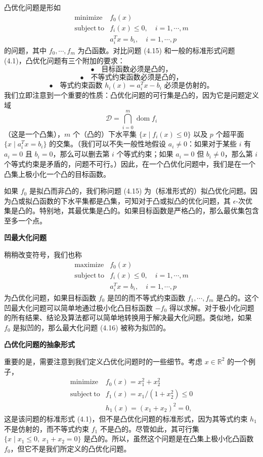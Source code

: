 \documentclass[UTF8,12pt,a4paper,fontset=fandol]{ctexart}
\begin{document}
凸优化问题是形如
\begin{equation}
\begin{array}{ll}
\mathop{\mathrm{minimize}} & f_0(x)\\
\mathrm{subject\ to} & f_i(x)\leq 0,\quad i=1,\cdots,m\\
& a_i^Tx=b_i,\quad i=1,\cdots,p
\end{array}
\tag{4.15}
\end{equation}
的问题，其中 $f_0,\cdots,f_m$ 为凸函数。对比问题 (4.15) 和一般的标准形式问题 (4.1)，凸优化问题有三个附加的要求：
\[
\bullet\quad \text{目标函数必须是凸的，}
\]
\[
\bullet\quad \text{不等式约束函数必须是凸的，}
\]
\[
\bullet\quad \text{等式约束函数 }h_i(x)=a_i^Tx-b_i\text{ 必须是仿射的。}
\]
我们立即注意到一个重要的性质：凸优化问题的可行集是凸的，因为它是问题定义域
\[
\mathcal{D}=\bigcap_{i=0}^{m}\operatorname{dom} f_i
\]
（这是一个凸集），$m$ 个（凸的）下水平集 $\{x\mid f_i(x)\leq 0\}$ 以及 $p$ 个超平面 $\{x\mid a_i^Tx=b_i\}$ 的交集。（我们可以不失一般性地假设 $a_i\neq 0$：如果对于某些 $i$ 有 $a_i=0$ 且 $b_i=0$，那么可以删去第 $i$ 个等式约束；如果 $a_i=0$ 但 $b_i\neq 0$，那么第 $i$ 个等式约束是矛盾的，问题不可行。）因此，在一个凸优化问题中，我们是在一个凸集上极小化一个凸的目标函数。

如果 $f_0$ 是拟凸而非凸的，我们称问题 (4.15) 为（标准形式的）拟凸优化问题。因为凸或拟凸函数的下水平集都是凸集，可知对于凸或拟凸的优化问题，其 $\epsilon$-次优集是凸的。特别地，其最优集是凸的。如果目标函数是严格凸的，那么最优集包含至多一个点。

\noindent\textbf{凹最大化问题}

稍稍改变符号，我们也称
\begin{equation}
\begin{array}{ll}
\mathop{\mathrm{maximize}} & f_0(x)\\
\mathrm{subject\ to} & f_i(x)\leq 0,\quad i=1,\cdots,m\\
& a_i^Tx=b_i,\quad i=1,\cdots,p
\end{array}
\tag{4.16}
\end{equation}
为凸优化问题，如果目标函数 $f_0$ 是凹的而不等式约束函数 $f_1,\cdots,f_m$ 是凸的。这个凹最大化问题可以简单地通过极小化凸目标函数 $-f_0$ 得以求解。对于极小化问题的所有结果、结论及算法都可以简单地转换用于解决最大化问题。类似地，如果 $f_0$ 是拟凹的，那么最大化问题 (4.16) 被称为拟凹的。

\noindent\textbf{凸优化问题的抽象形式}

重要的是，需要注意到我们定义凸优化问题时的一些细节。考虑 $x\in\mathbb{R}^2$ 的一个例子，
\begin{equation}
\begin{array}{ll}
\mathop{\mathrm{minimize}} & f_0(x)=x_1^2+x_2^2\\
\mathrm{subject\ to} & f_1(x)=x_1/(1+x_2^2)\leq 0\\
& h_1(x)=(x_1+x_2)^2=0,
\end{array}
\tag{4.17}
\end{equation}
这是该问题的标准形式 (4.1)，但不是凸优化问题的标准形式，因为其等式约束 $h_1$ 不是仿射的，而不等式约束 $f_1$ 不是凸的。尽管如此，其可行集 $\{x\mid x_1\leq 0,\ x_1+x_2=0\}$ 是凸的。所以，虽然这个问题是在凸集上极小化凸函数 $f_0$，但它不是我们所定义的凸优化问题。
\end{document}

